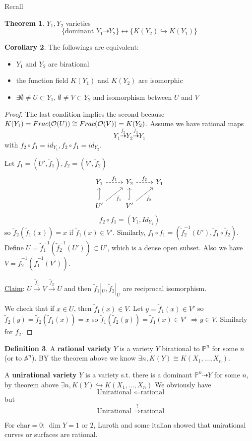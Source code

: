 \documentclass[11pt]{article}
\theoremstyle{definition}
\newtheorem{thm}{Theorem}[section]
\newtheorem{cor}[thm]{Corollary}
\newtheorem{dfn}[thm]{Definition}
\newcommand{\affn}{\mathbb A}
\newcommand{\proj}{\mathbb P}
\newcommand{\calo}{{\cal O}}
\newcommand{\drta}{\dashrightarrow}
\newcommand{\Lrta}{\Longrightarrow}
\newcommand{\lrta}{\longrightarrow}
\newcommand{\llrta}{\longleftrightarrow}
\newcommand{\Llta}{\Longleftarrow}
\newcommand{\inj}{\hookrightarrow}
\begin{document}
Recall
\begin{thm} $Y_1,Y_2$ varieties
$$\{ \text{dominant }Y_1\dashrightarrow Y_2\}\llrta\{K(Y_2)\inj K(Y_1)\}$$
\end{thm}
\begin{cor}The followings are equivalent:
\begin{itemize}
	\item
$Y_1$  and $Y_2$ are birational \item the function field $K(Y_1)$ and $K(Y_2)$ are isomorphic
\item $\exists \emptyset \neq U\subset Y_1$, $\emptyset \neq V\subset Y_2$ and isomorphism between $U$ and $V$
\end{itemize}
\end{cor}
\begin{proof}
The last condition implies the second because $K(Y_1)=Frac(\calo(U))\cong Frac(\calo(V))=K(Y_2)$. Assume we have rational maps 
$$
Y_1\overset{f_2}{\drta}Y_2\overset{f_2}{\drta} Y_1
$$
with $f_2\circ f_1=id_{Y_1}, f_2\circ f_1= id_{Y_2}$. 

Let $f_1=(U',\tilde{f}_1), f_2=(V',\tilde{f}_2)$
\[
\begin{tikzcd}
Y_1 \arrow[r, dashed,"f_1"] & Y_2 \arrow[r, dashed,"f_2"] & Y_1 \\
U' \arrow[ru, "\tilde{f}_1"'] \arrow[u,hook] & V' \arrow[ru, "\tilde{f}_2"'] \arrow[u, hook] & 
\end{tikzcd}
\]
$$
f_2\circ f_1=(Y_1,Id_{Y_1})
$$
so $\tilde{f}_2(\tilde{f}_1(x))=x$ if $\tilde{f}_1(x)\in V'$.
Similarly, $f_1\circ f_1=(\tilde{f}_2^{-1}(U'),\tilde{f}_1\circ \tilde{f}_2)$. Define $U=\tilde{f}^{-1}_{1}(\tilde{f}_{2}^{-1}(U'))\subset U'$, which is a dense open subset. Also we have $V=\tilde{f}^{-1}_{2}(\tilde{f}_{1}^{-1}(V'))$.

\underline{Claim}: $U\overset{\tilde{f}_1}{\lrta }V\overset{\tilde{f}_2}{\lrta} U$ and then $\tilde{f}_1|_U,\tilde{f}_2|_U$ are reciprocal isomorphism.

We check that if $x\in  U$, then $\tilde{f}_1(x)\in V$.
Let $y=\tilde{f}_1(x)\in V'$ so $\tilde{f}_2(y)=\tilde{f}_2(\tilde{f}_1(x))=x$ so $\tilde{f}_1(\tilde{f}_2(y))=\tilde{f}_1(x)\in V'$ $\Lrta y\in V$. Similarly for $f_2$.
\end{proof}

\begin{dfn}
A \textbf{rational variety} $Y$ is a variety $Y$ birational to $\proj^n$ for some $n$ (or to $\affn^n$). BY the theorem above we know $\exists n, K(Y)\cong K(X_1,...,X_n)$. 

A \textbf{unirational variety} $Y$ is a variety s.t. there is a dominant $\proj^n\drta Y$ for some $n$, by theorem above $\exists n, K(Y)\inj K(X_1,...,X_n)$
We obviously have
$$
\text{ Unirational } \Llta \text{rational}
$$
but 
$$
\text{ Unirational } \overset{?}{\Lrta} \text{rational}
$$
\end{dfn}
For $\text{char}= 0$: $\dim Y=1$ or $2$, Luroth and some italian showed that unirational curves or surfaces are rational.
\end{document}
